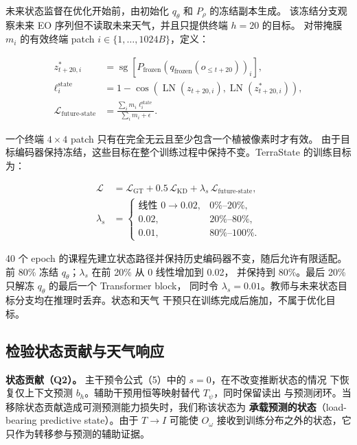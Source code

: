 \documentclass[11pt,a4paper,fontset=fandol]{ctexart}
\begin{document}
未来状态监督在优化开始前，由初始化 $q_\theta$ 和 $P_\rho$ 的冻结副本生成。 该冻结分支观察未来 EO 序列但不读取未来天气，并且只提供终端 $h=20$ 的目标。 对带掩膜 $m_i$ 的有效终端 patch $i\in\{1,\ldots,1024B\}$，定义：

\begin{equation*}
\begin{aligned}
z^*_{t+20,i}
&=\operatorname{sg}\!\left[
P_{\mathrm{frozen}}\!\left(
q_{\mathrm{frozen}}(o_{\leq t+20})\right)_i\right],\\
\ell_i^{\mathrm{state}}
&=1-\cos\!\left(
\operatorname{LN}(z_{t+20,i}),
\operatorname{LN}(z^*_{t+20,i})\right),\\
\mathcal L_{\mathrm{future\text{-}state}}
&=\frac{\sum_i m_i\ell_i^{\mathrm{state}}}
{\sum_i m_i+\epsilon}.
\end{aligned}
\tag{8}
\end{equation*}

一个终端 $4\times4$ patch 只有在完全无云且至少包含一个植被像素时才有效。 由于目标编码器保持冻结，这些目标在整个训练过程中保持不变。TerraState 的训练目标为：

\begin{equation*}
\begin{aligned}
\mathcal L
&=\mathcal L_{\mathrm{GT}}
+0.5\,\mathcal L_{\mathrm{KD}}
+\lambda_s\,\mathcal L_{\mathrm{future\text{-}state}},\\
\lambda_s&=
\begin{cases}
\text{线性 }0\rightarrow0.02, & 0\%\text{--}20\%,\\
0.02, & 20\%\text{--}80\%,\\
0.01, & 80\%\text{--}100\%.
\end{cases}
\end{aligned}
\tag{9}
\end{equation*}

40 个 epoch 的课程先建立状态路径并保持历史编码器不变，随后允许有限适配。 前 80\% 冻结 $q_\theta$；$\lambda_s$ 在前 20\% 从 0 线性增加到 0.02， 并保持到 80\%。最后 20\% 只解冻 $q_\theta$ 的最后一个 Transformer block， 同时令 $\lambda_s=0.01$。教师与未来状态目标分支均在推理时丢弃。状态和天气 干预只在训练完成后施加，不属于优化目标。

\subsection{检验状态贡献与天气响应}

\textbf{状态贡献（Q2）。} 主干预令公式（5）中的 $s=0$，在不改变推断状态的情况 下恢复仅上下文预测 $b_h$。辅助干预用恒等映射替代 $T_\psi$，同时保留读出 与预测闭环。当移除状态贡献造成可测预测能力损失时，我们称该状态为 \textbf{承载预测的状态}（load-bearing predictive state）。由于 $T\rightarrow I$ 可能使 $O_\omega$ 接收到训练分布之外的状态，它只作为转移参与预测的辅助证据。
\end{document}
